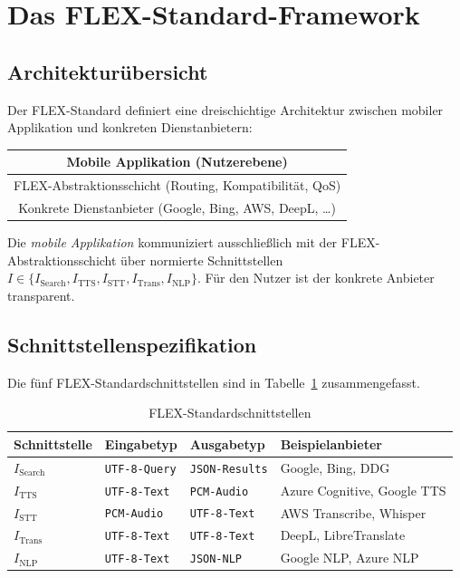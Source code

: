 ﻿\documentclass[a4paper,12pt]{article}
\theoremstyle{definition}
\begin{document}
\section{Das FLEX-Standard-Framework}
\label{sec:flex}

\subsection{Architekturübersicht}

Der FLEX-Standard definiert eine dreischichtige Architektur zwischen mobiler Applikation und konkreten Dienstanbietern:

\begin{center}
\begin{tabular}{|c|}
\hline
\rule{0pt}{2.2ex}\textbf{Mobile Applikation (Nutzerebene)}\\
\hline
\rule{0pt}{2.2ex}FLEX-Abstraktionsschicht (Routing, Kompatibilität, QoS)\\
\hline
\rule{0pt}{2.2ex}Konkrete Dienstanbieter (Google, Bing, AWS, DeepL, \ldots)\\
\hline
\end{tabular}
\end{center}

\medskip
\noindent
Die \emph{mobile Applikation} kommuniziert ausschließlich mit der FLEX-Abstraktionsschicht über normierte Schnittstellen $I \in \{I_\mathrm{Search}, I_\mathrm{TTS}, I_\mathrm{STT}, I_\mathrm{Trans}, I_\mathrm{NLP}\}$. Für den Nutzer ist der konkrete Anbieter transparent.

\subsection{Schnittstellenspezifikation}

Die fünf FLEX-Standardschnittstellen sind in Tabelle~\ref{tab:interfaces} zusammengefasst.

\begin{table}[h]
\centering
\caption{FLEX-Standardschnittstellen}
\label{tab:interfaces}
\begin{tabular}{llll}
\toprule
Schnittstelle & Eingabetyp & Ausgabetyp & Beispielanbieter \\
\midrule
$I_\mathrm{Search}$ & \texttt{UTF-8-Query} & \texttt{JSON-Results} & Google, Bing, DDG \\
$I_\mathrm{TTS}$    & \texttt{UTF-8-Text} & \texttt{PCM-Audio} & Azure Cognitive, Google TTS \\
$I_\mathrm{STT}$    & \texttt{PCM-Audio} & \texttt{UTF-8-Text} & AWS Transcribe, Whisper \\
$I_\mathrm{Trans}$  & \texttt{UTF-8-Text} & \texttt{UTF-8-Text} & DeepL, LibreTranslate \\
$I_\mathrm{NLP}$    & \texttt{UTF-8-Text} & \texttt{JSON-NLP} & Google NLP, Azure NLP \\
\bottomrule
\end{tabular}
\end{table}
\end{document}
